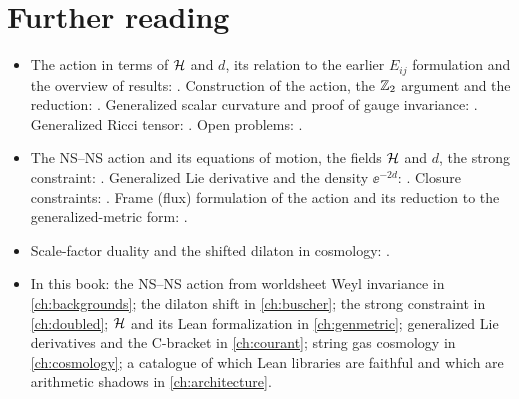 \section*{Further reading}
\begin{itemize}[leftmargin=*]
\item The action in terms of $\mathcal{H}$ and $d$, its relation to the earlier $E_{ij}$ formulation and
 the overview of results: . Construction of the action, the $\mathbb{Z}_2$
 argument and the reduction: . Generalized scalar curvature and
 proof of gauge invariance: . Generalized Ricci tensor:
 . Open problems: .
\item The NS--NS action and its equations of motion, the fields $\mathcal{H}$ and $d$, the strong
 constraint: . Generalized Lie derivative and the density
 $\ee^{-2d}$: . Closure constraints: . Frame (flux) formulation of the action and its reduction to the
 generalized-metric form: .
\item Scale-factor duality and the shifted dilaton in cosmology: .
\item In this book: the NS--NS action from worldsheet Weyl invariance in \cref{ch:backgrounds};
 the dilaton shift in \cref{ch:buscher}; the strong constraint in \cref{ch:doubled}; $\mathcal{H}$ and
 its Lean formalization in \cref{ch:genmetric}; generalized Lie derivatives and the C-bracket in
 \cref{ch:courant}; string gas cosmology in \cref{ch:cosmology}; a catalogue of which Lean
 libraries are faithful and which are arithmetic shadows in \cref{ch:architecture}.
\end{itemize}
